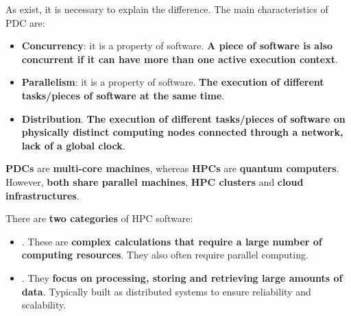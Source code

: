 \noindent
As  exist, it is necessary to explain the difference. The main characteristics of PDC are:
\begin{itemize}
    \item \textbf{Concurrency}: it is a property of software. \textbf{A piece of software is also concurrent if it can have more than one active execution context}.

    \item \textbf{Parallelism}: it is a property of software. \textbf{The execution of different tasks/pieces of software at the same time}.

    \item \textbf{Distribution}. \textbf{The execution of different tasks/pieces of software on physically distinct computing nodes connected through a network, lack of a global clock}.
\end{itemize}
\textbf{PDCs} are \textbf{multi-core machines}, whereas \textbf{HPCs} are \textbf{quantum computers}. However, \textbf{both share parallel machines}, \textbf{HPC clusters} and \textbf{cloud infrastructures}.

\newpage

\noindent
There are \textbf{two categories} of HPC software:
\begin{itemize}
    \item {}. These are \textbf{complex calculations that require a large number of computing resources}. They also often require parallel computing.

    \item {}. They \textbf{focus on processing, storing and retrieving large amounts of data}. Typically built as distributed systems to ensure reliability and scalability.
\end{itemize}